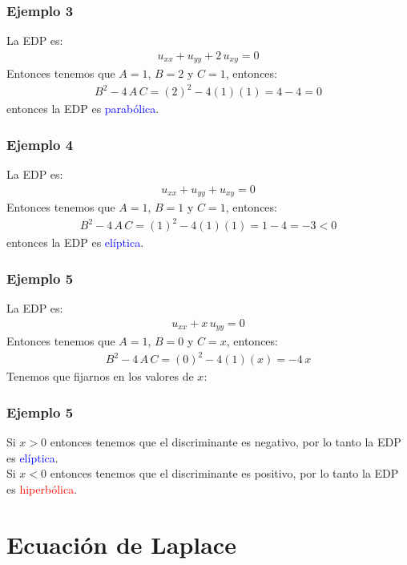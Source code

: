 \begin{frame}
\frametitle{Ejemplo 3}
La EDP es:
\begin{align*}
u_{xx} + u_{yy} + 2 \, u_{xy} = 0
\end{align*}
\pause
Entonces tenemos que $A = 1$, $B = 2$ y $C = 1$, entonces:
\begin{align*}
B^{2} - 4 \, A \, C = (2)^{2} - 4 (1)(1) = 4 - 4 = 0
\end{align*}
entonces la EDP es \textcolor{blue}{parabólica}.
\end{frame}
\begin{frame}
\frametitle{Ejemplo 4}
La EDP es:
\begin{align*}
u_{xx} + u_{yy} + u_{xy} = 0
\end{align*}
\pause
Entonces tenemos que $A = 1$, $B = 1$ y $C = 1$, entonces:
\begin{align*}
B^{2} - 4 \, A \, C = (1)^{2} - 4 (1)(1) = 1 - 4 = -3 < 0
\end{align*}
\pause
entonces la EDP es \textcolor{blue}{elíptica}.
\end{frame}
\begin{frame}
\frametitle{Ejemplo 5}
La EDP es:
\begin{align*}
u_{xx} + x \, u_{yy} = 0
\end{align*}
\pause
Entonces tenemos que $A = 1$, $B = 0$ y $C = x$, entonces:
\begin{align*}
B^{2} - 4 \, A \, C = (0)^{2} - 4 (1)(x) = - 4 \, x
\end{align*}
\pause
Tenemos que fijarnos en los valores de $x$:
\end{frame}
\begin{frame}
\frametitle{Ejemplo 5}
Si $x > 0$ entonces tenemos que el discriminante es negativo, por lo tanto la EDP es \textcolor{blue}{elíptica}.
\\
\bigskip
\pause
Si $x < 0$ entonces tenemos que el discriminante es positivo, por lo tanto la EDP es \textcolor{red}{hiperbólica}.
\end{frame}
\section{Ecuación de Laplace}

